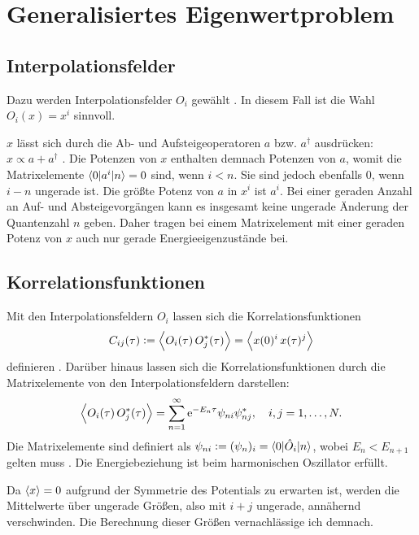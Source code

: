 \section{Generalisiertes Eigenwertproblem}

\subsection{Interpolationsfelder}

Dazu werden Interpolationsfelder $O_i$ gewählt
\parencite[1]{Blossier/Eigenvalue}. In diesem Fall ist die Wahl $O_i(x) = x^i$
sinnvoll.

$x$ lässt sich durch die Ab- und Aufsteigeoperatoren $a$ bzw. $a^\dagger$
ausdrücken: $x \propto a + a^\dagger$
\parencite[(3.5a)]{Schwabl/Quantenmechanik}. Die Potenzen von $x$ enthalten
demnach Potenzen von $a$, womit die Matrixelemente $\braket{0|a^i|n} = 0$ sind,
wenn $i < n$. Sie sind jedoch ebenfalls 0, wenn $i - n$ ungerade ist. Die
größte Potenz von $a$ in $x^i$ ist $a^i$. Bei einer geraden Anzahl an Auf- und
Absteigevorgängen kann es insgesamt keine ungerade Änderung der Quantenzahl $n$
geben. Daher tragen bei einem Matrixelement mit einer geraden Potenz von $x$
auch nur gerade Energieeigenzustände bei.

\subsection{Korrelationsfunktionen}

Mit den Interpolationsfeldern $O_i$ lassen sich die Korrelationsfunktionen
\[
    C_{ij}(\tau) := \left\langle O_i(\tau) \, O_j^*(\tau) \right\rangle
    = \left\langle x(0)^i \, x(\tau)^j \right\rangle
\]
definieren \parencite[(2.1)]{Blossier/Eigenvalue}. Darüber hinaus lassen sich
die Korrelationsfunktionen durch die Matrixelemente von den
Interpolationsfeldern darstellen:
\[
    \left\langle O_i(\tau) \, O_j^*(\tau) \right\rangle
    = \sum_{n=1}^\infty \mathrm e^{-E_n \tau} \psi_{ni} \psi_{nj}^*
    ,\quad
    i, j = 1, \ldots, N.
\]
Die Matrixelemente sind definiert als $\psi_{ni} := (\psi_n)_i = \braket{0 |
\hat O_i | n}$, wobei $E_n < E_{n+1}$ gelten muss
\parencite[(2.1)]{Blossier/Eigenvalue}. Die Energiebeziehung ist beim
harmonischen Oszillator erfüllt.

Da $\langle x \rangle = 0$ aufgrund der Symmetrie des Potentials zu erwarten ist,
werden die Mittelwerte über ungerade Größen, also mit $i + j$ ungerade,
annähernd verschwinden. Die Berechnung dieser Größen vernachlässige ich
demnach.

